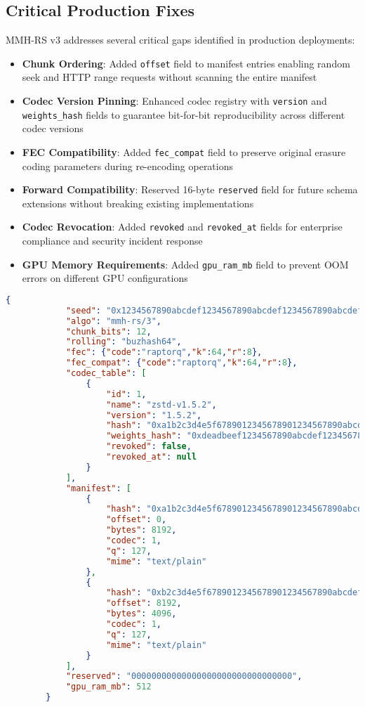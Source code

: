 \documentclass[11pt,a4paper]{article}
\begin{document}
	\subsection{Critical Production Fixes}
	
	MMH-RS v3 addresses several critical gaps identified in production deployments:
	
	\begin{itemize}
		\item \textbf{Chunk Ordering}: Added \texttt{offset} field to manifest entries enabling random seek and HTTP range requests without scanning the entire manifest
		\item \textbf{Codec Version Pinning}: Enhanced codec registry with \texttt{version} and \texttt{weights\_hash} fields to guarantee bit-for-bit reproducibility across different codec versions
		\item \textbf{FEC Compatibility}: Added \texttt{fec\_compat} field to preserve original erasure coding parameters during re-encoding operations
		\item \textbf{Forward Compatibility}: Reserved 16-byte \texttt{reserved} field for future schema extensions without breaking existing implementations
		\item \textbf{Codec Revocation}: Added \texttt{revoked} and \texttt{revoked\_at} fields for enterprise compliance and security incident response
		\item \textbf{GPU Memory Requirements}: Added \texttt{gpu\_ram\_mb} field to prevent OOM errors on different GPU configurations
	\end{itemize}
	\begin{lstlisting}[language=json, breaklines=true, basicstyle=\ttfamily\footnotesize, columns=fullflexible, keepspaces=true]
		{
			"seed": "0x1234567890abcdef1234567890abcdef1234567890abcdef1234567890abcdef",
			"algo": "mmh-rs/3",
			"chunk_bits": 12,
			"rolling": "buzhash64",
			"fec": {"code":"raptorq","k":64,"r":8},
			"fec_compat": {"code":"raptorq","k":64,"r":8},
			"codec_table": [
				{
					"id": 1,
					"name": "zstd-v1.5.2",
					"version": "1.5.2",
					"hash": "0xa1b2c3d4e5f6789012345678901234567890abcdef1234567890abcdef12345678",
					"weights_hash": "0xdeadbeef1234567890abcdef1234567890abcdef1234567890abcdef12345678",
					"revoked": false,
					"revoked_at": null
				}
			],
			"manifest": [
				{
					"hash": "0xa1b2c3d4e5f6789012345678901234567890abcdef1234567890abcdef12345678",
					"offset": 0,
					"bytes": 8192,
					"codec": 1,
					"q": 127,
					"mime": "text/plain"
				},
				{
					"hash": "0xb2c3d4e5f6789012345678901234567890abcdef1234567890abcdef1234567890",
					"offset": 8192,
					"bytes": 4096,
					"codec": 1,
					"q": 127,
					"mime": "text/plain"
				}
			],
			"reserved": "00000000000000000000000000000000",
			"gpu_ram_mb": 512
		}
	\end{lstlisting}
	
\end{document}
